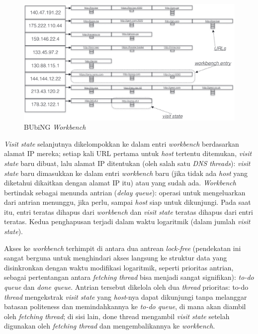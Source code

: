\begin{figure}[H]
  \centering{}
  \includegraphics[width=1\textwidth]{gambar/bubing_workbench}
  \caption{BUbiNG \emph{Workbench}}
\end{figure}

\emph{Visit state} selanjutnya dikelompokkan ke dalam entri \emph{workbench} berdasarkan alamat IP mereka; setiap kali URL pertama untuk \emph{host} tertentu ditemukan, \emph{visit state} baru dibuat, lalu alamat IP ditentukan (oleh salah satu \emph{DNS threads}): \emph{visit state} baru dimasukkan ke dalam entri \emph{workbench} baru (jika tidak ada \emph{host} yang diketahui dikaitkan dengan alamat IP itu) atau yang sudah ada. \emph{Workbench} bertindak sebagai menunda antrian (\emph{delay queue}): operasi untuk mengeluarkan dari antrian menunggu, jika perlu, sampai \emph{host} siap untuk dikunjungi. Pada saat itu, entri teratas dihapus dari \emph{workbench} dan \emph{visit state} teratas dihapus dari entri teratas. Kedua penghapusan terjadi dalam waktu logaritmik (dalam jumlah \emph{visit state}).

Akses ke \emph{workbench} terhimpit di antara dua antrean \emph{lock-free} (pendekatan ini sangat berguna untuk menghindari akses langsung ke struktur data yang disinkronkan dengan waktu modifikasi logaritmik, seperti prioritas antrian, sebagai pertentangan antara \emph{fetching thread} bisa menjadi sangat signifikan): \emph{to-do queue} dan \emph{done queue}. Antrian tersebut dikelola oleh dua \emph{thread} prioritas: to-do \emph{thread} mengekstrak \emph{visit state} yang \emph{host}-nya dapat dikunjungi tanpa melanggar batasan politeness dan memindahkannya ke \emph{to-do queue}, di mana akan diambil oleh \emph{fetching thread}; di sisi lain, done thread mengambil \emph{visit state} setelah digunakan oleh \emph{fetching thread} dan mengembalikannya ke \emph{workbench}.
	
